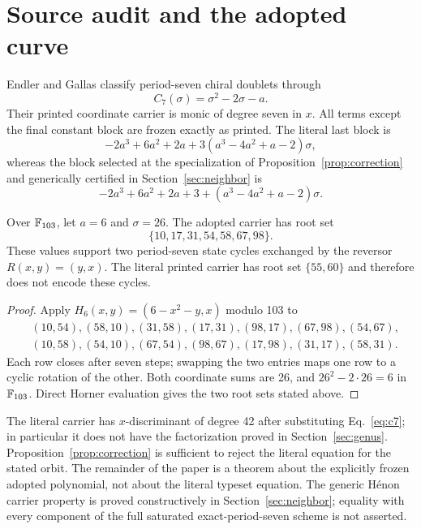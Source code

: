 \section{Source audit and the adopted curve}

Endler and Gallas classify period-seven chiral doublets through
\begin{equation}\label{eq:c7}
 C_7(\sigma)=\sigma^2-2\sigma-a.
\end{equation}
Their printed coordinate carrier is monic of degree seven in $x$.  All terms
except the final constant block are frozen exactly as printed.  The literal
last block is
\begin{equation}\label{eq:literal}
 -2a^3+6a^2+2a+3(a^3-4a^2+a-2)\sigma,
\end{equation}
whereas the block selected at the specialization of
Proposition~\ref{prop:correction} and generically certified in
Section~\ref{sec:neighbor} is
\begin{equation}\label{eq:corrected}
 -2a^3+6a^2+2a+3+(a^3-4a^2+a-2)\sigma.
\end{equation}

\begin{proposition}\label{prop:correction}
Over $\mathbb F_{103}$, let $a=6$ and $\sigma=26$.  The adopted carrier has root
set
\[
 \{10,17,31,54,58,67,98\}.
\]
These values support two period-seven state cycles exchanged by the reversor
$R(x,y)=(y,x)$.  The literal printed carrier has root set $\{55,60\}$ and
therefore does not encode these cycles.
\end{proposition}

\begin{proof}
Apply $H_6(x,y)=(6-x^2-y,x)$ modulo 103 to
\begin{align*}
 &(10,54),(58,10),(31,58),(17,31),(98,17),(67,98),(54,67),\\
 &(10,58),(54,10),(67,54),(98,67),(17,98),(31,17),(58,31).
\end{align*}
Each row closes after seven steps; swapping the two entries maps one row to a
cyclic rotation of the other.  Both coordinate sums are 26, and
$26^2-2\cdot26=6$ in $\mathbb F_{103}$.  Direct Horner evaluation gives the two root
sets stated above.
\end{proof}

The literal carrier has $x$-discriminant of degree 42 after substituting
Eq.~\eqref{eq:c7}; in particular it does not have the factorization proved in
Section~\ref{sec:genus}.  Proposition~\ref{prop:correction} is sufficient to
reject the literal equation for the stated orbit.  The remainder of the paper
is a theorem about the explicitly frozen adopted polynomial, not about the
literal typeset equation.  The generic H\'enon carrier property is proved
constructively in Section~\ref{sec:neighbor}; equality with every component
of the full saturated exact-period-seven scheme is not asserted.

